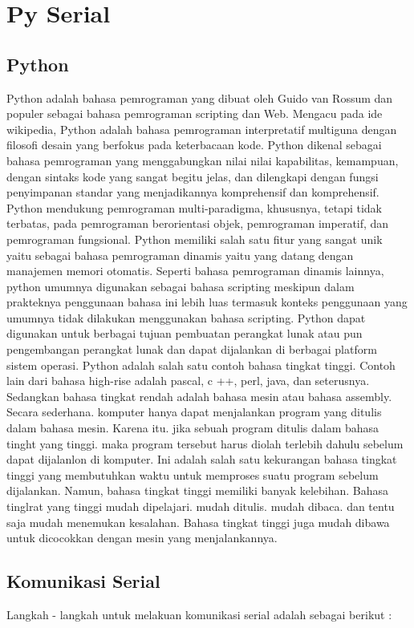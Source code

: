\section{Py Serial}

	\subsection{Python}
	Python adalah bahasa pemrograman yang dibuat oleh Guido van Rossum dan populer sebagai bahasa pemrograman scripting dan Web. Mengacu pada ide wikipedia, Python adalah bahasa pemrograman interpretatif multiguna dengan filosofi desain yang berfokus pada keterbacaan kode. 
	Python dikenal sebagai bahasa pemrograman yang menggabungkan nilai nilai kapabilitas, kemampuan, dengan sintaks kode yang sangat begitu jelas, dan dilengkapi dengan fungsi penyimpanan standar yang menjadikannya komprehensif dan komprehensif. 
	Python mendukung pemrograman multi-paradigma, khususnya, tetapi tidak terbatas, pada pemrograman berorientasi objek, pemrograman imperatif, dan pemrograman fungsional. 
	Python memiliki salah satu fitur yang sangat unik yaitu sebagai bahasa pemrograman dinamis yaitu yang datang dengan manajemen memori otomatis. Seperti bahasa 
	pemrograman dinamis lainnya, python umumnya digunakan sebagai bahasa scripting meskipun dalam prakteknya penggunaan bahasa ini lebih luas termasuk konteks penggunaan yang umumnya tidak dilakukan menggunakan bahasa scripting. 
	Python dapat digunakan untuk berbagai tujuan pembuatan perangkat lunak atau pun pengembangan perangkat lunak dan dapat dijalankan di berbagai platform sistem operasi. Python adalah salah satu contoh bahasa tingkat tinggi. 
	Contoh lain dari bahasa high-rise adalah pascal, c ++, perl, java, dan seterusnya. Sedangkan bahasa tingkat rendah adalah bahasa mesin atau bahasa assembly. 
	Secara sederhana. komputer hanya dapat menjalankan program yang ditulis dalam bahasa mesin. Karena itu. jika sebuah program ditulis dalam bahasa tinght yang tinggi. maka program tersebut harus diolah terlebih dahulu sebelum dapat dijalanlon di komputer. 
	Ini adalah salah satu kekurangan bahasa tingkat tinggi yang membutuhkan waktu untuk memproses suatu program sebelum dijalankan. Namun, bahasa tingkat tinggi memiliki banyak kelebihan. Bahasa tinglrat yang tinggi mudah dipelajari. mudah ditulis. mudah dibaca. dan tentu saja mudah menemukan kesalahan. Bahasa tingkat tinggi juga mudah dibawa untuk dicocokkan dengan mesin yang menjalankannya. 
	
	\subsection{Komunikasi Serial}
		Langkah - langkah untuk melakuan komunikasi serial adalah sebagai berikut :
		
